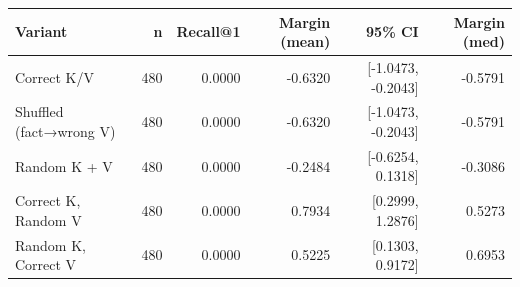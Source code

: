 \begin{tabular}{l r r r r r}
\toprule
Variant & n & Recall@1 & Margin (mean) & 95\% CI & Margin (med) \\  %
\midrule
Correct K/V & 480 & 0.0000 & -0.6320 & [-1.0473, -0.2043] & -0.5791 \\
Shuffled (fact→wrong V) & 480 & 0.0000 & -0.6320 & [-1.0473, -0.2043] & -0.5791 \\
Random K + V & 480 & 0.0000 & -0.2484 & [-0.6254, 0.1318] & -0.3086 \\
Correct K, Random V & 480 & 0.0000 & 0.7934 & [0.2999, 1.2876] & 0.5273 \\
Random K, Correct V & 480 & 0.0000 & 0.5225 & [0.1303, 0.9172] & 0.6953 \\
\bottomrule
\end{tabular}
